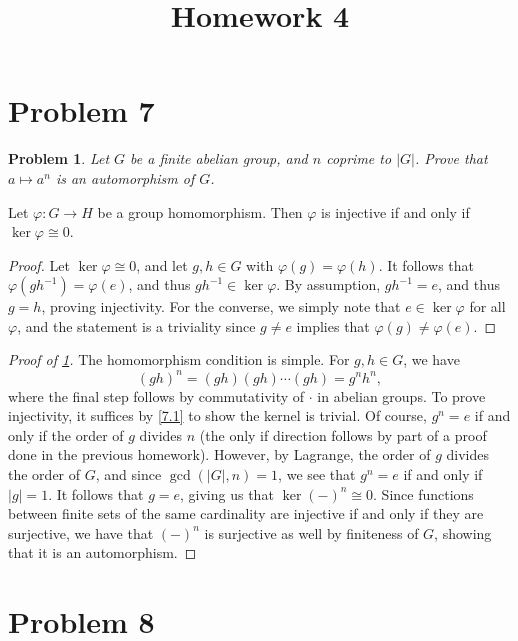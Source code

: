 \documentclass[11pt, letterpaper]{article}
\title{Homework 4}
\theoremstyle{plain}
\newtheorem{problem}{Problem}[section]
\begin{document}
\makeproblem
\setcounter{section}{6}

\section{Problem 7}

\begin{problem}\label{7}
	Let $G$ be a finite abelian group, and $n$ coprime to $\left| G \right| $. Prove that $a\mapsto a^n$ is an automorphism of $G$.
\end{problem}
\begin{lemma}\label{7.1}
	Let $\varphi : G \to H$ be a group homomorphism. Then $\varphi $ is injective if and only if $\ker \varphi \cong 0$.
\end{lemma}
\begin{proof}
	Let $\ker \varphi \cong 0$, and let $g,h\in G$ with $\varphi (g)=\varphi (h)$. It follows that $\varphi (gh^{-1} )=\varphi (e)$, and thus $gh^{-1} \in \ker \varphi $. By assumption, $gh^{-1} =e$, and thus $g=h$, proving injectivity. For the converse, we simply note that $e\in \ker \varphi $ for all $\varphi $, and the statement is a triviality since $g\neq e$ implies that $\varphi (g)\neq \varphi (e)$.
\end{proof}
\begin{proof}[Proof of \cref{7}]
	The homomorphism condition is simple. For $g,h\in G$, we have
	\[
		(gh)^n=(gh)(gh)\cdots(gh)=g^nh^n,
	\]
	where the final step follows by commutativity of $\cdot $ in abelian groups. To prove injectivity, it suffices by \cref{7.1} to show the kernel is trivial. Of course, $g^n=e$ if and only if the order of $g$ divides $n$ (the only if direction follows by part of a proof done in the previous homework). However, by Lagrange, the order of $g$ divides the order of $G$, and since $\operatorname{gcd} (\left| G \right| ,n)=1$, we see that $g^n=e$ if and only if $\left| g \right| =1$. It follows that $g=e$, giving us that $\ker (-)^n\cong 0$. Since functions between finite sets of the same cardinality are injective if and only if they are surjective, we have that $(-)^n$ is surjective as well by finiteness of $G$, showing that it is an automorphism.
\end{proof}


\section{Problem 8}
\end{document}
